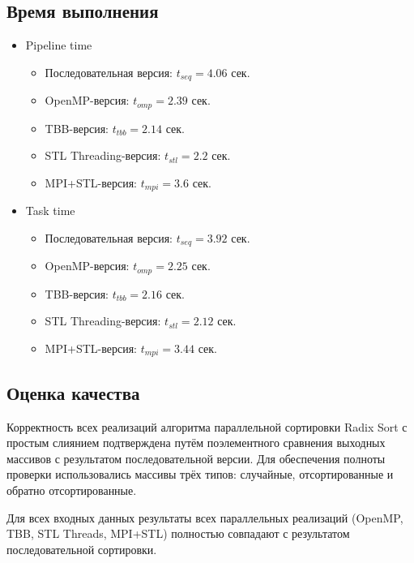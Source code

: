 \documentclass[a4paper,12pt]{article}
\begin{document}
\subsection{Время выполнения}
\sloppy
\begin{itemize}
    \item Pipeline time
    \begin{itemize}
        \item Последовательная версия: $t_{seq} = 4.06$ сек.
        \item OpenMP-версия: $t_{omp} = 2.39$ сек.
        \item TBB-версия: $t_{tbb} = 2.14$ сек.
        \item STL Threading-версия: $t_{stl} = 2.2$ сек.
        \item MPI+STL-версия: $t_{mpi} = 3.6$ сек.
    \end{itemize}
    \item Task time
    \begin{itemize}
        \item Последовательная версия: $t_{seq} = 3.92$ сек.
        \item OpenMP-версия: $t_{omp} = 2.25$ сек.
        \item TBB-версия: $t_{tbb} = 2.16$ сек.
        \item STL Threading-версия: $t_{stl} = 2.12$ сек.
        \item MPI+STL-версия: $t_{mpi} = 3.44$ сек.
    \end{itemize}
\end{itemize}
\fussy

\subsection{Оценка качества}
Корректность всех реализаций алгоритма параллельной сортировки Radix Sort с простым слиянием подтверждена путём поэлементного сравнения выходных массивов с результатом последовательной версии. Для обеспечения полноты проверки использовались массивы трёх типов: случайные, отсортированные и обратно отсортированные.

Для всех входных данных результаты всех параллельных реализаций (OpenMP, TBB, STL Threads, MPI+STL) полностью совпадают с результатом последовательной сортировки.
\end{document}
